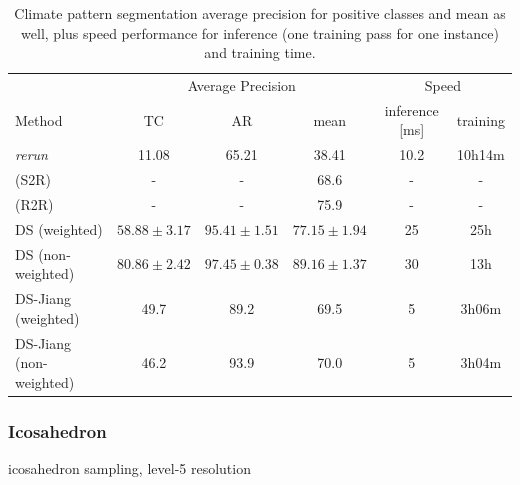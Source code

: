 \documentclass{article} %
\begin{document}
\begin{table}[!ht]
\begin{tabular}{l|c c c c c}
        \multicolumn{1}{l}{} & \multicolumn{3}{c}{Average Precision} & \multicolumn{2}{c}{Speed}\\
        \cmidrule(lr){2-4}\cmidrule(lr){5-6}
        \multicolumn{1}{l}{Method} & TC & AR & mean & inference [ms] & training \\ \hline
        \cite{jiang_spherical_2019} \emph{rerun} & 11.08 & 65.21 & 38.41 & 10.2 & 10h14m\\
        \cite{cohen_gauge_2019} (S2R) & - & -& 68.6 & - & - \\
        \cite{cohen_gauge_2019} (R2R) & - & -& 75.9 & - & -\\ \hline
        DS (weighted) & $58.88\pm 3.17$ & $95.41\pm 1.51$ & $77.15\pm 1.94$ & 25 & 25h \\
        DS (non-weighted) & $80.86\pm 2.42$ & $97.45\pm 0.38$ & $89.16\pm 1.37$ & 30 & 13h \\ \hline
        DS-Jiang (weighted) & 49.7 & 89.2 & 69.5 & 5 & 3h06m\\
        DS-Jiang (non-weighted) & 46.2 & 93.9 & 70.0 & 5 & 3h04m
    \end{tabular}
    \caption{Climate pattern segmentation average precision for positive classes and mean as well, plus speed performance for inference (one training pass for one instance)  and training time.}
\end{table}
\subsubsection*{Icosahedron}
icosahedron sampling, level-5 resolution
\end{document}
